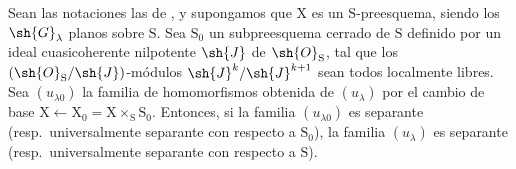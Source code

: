 \begin{proposition}[11.9.15]
\label{IV.11.9.15}
Sean las notaciones las de , y supongamos que $\mathrm{X}$ es un $\mathrm{S}$-preesquema, siendo los $\sh{G}_\lambda$ planos sobre $\mathrm{S}$.
Sea $\mathrm{S}_0$ un subpreesquema cerrado de $\mathrm{S}$ definido por un ideal cuasicoherente nilpotente $\sh{J}$ de $\sh{O}_\mathrm{S}$, tal que los $(\sh{O}_\mathrm{S}/\sh{J})$-módulos $\sh{J}^k/\sh{J}^{k+1}$ sean todos localmente libres.
Sea $(u_{\lambda 0})$ la familia de homomorfismos obtenida de $(u_\lambda)$ por el cambio de base $\mathrm{X}\leftarrow\mathrm{X}_0=\mathrm{X}\times_\mathrm{S}\mathrm{S}_0$.
Entonces, si la familia $(u_{\lambda 0})$ es separante (resp.\ universalmente separante con respecto a $\mathrm{S}_0$), la familia $(u_\lambda)$ es separante (resp.\ universalmente separante con respecto a $\mathrm{S}$).
\end{proposition}

